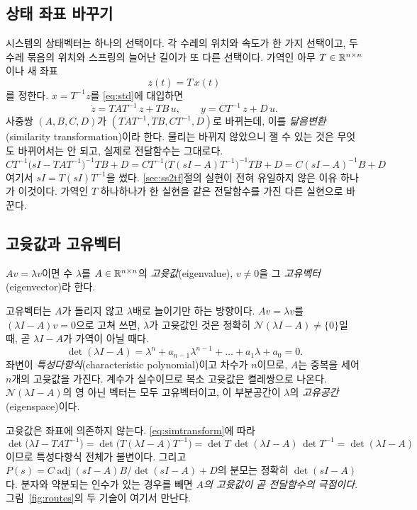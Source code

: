 \documentclass[11pt]{article}
\begin{document}
\subsection{상태 좌표 바꾸기}\label{sec:similarity}
시스템의 상태벡터는 하나의 선택이다. 각 수레의 위치와 속도가 한 가지 선택이고, 두
수레 묶음의 위치와 스프링의 늘어난 길이가 또 다른 선택이다. 가역인 아무
$T\in\mathbb{R}^{n\times n}$이나 새 좌표
\[
   z(t) = T\,x(t)
\]
를 정한다. $x=T^{-1}z$를 \eqref{eq:std}에 대입하면
\begin{equation}\label{eq:simtransform}
   \dot z = TAT^{-1}\,z + TB\,u, \qquad y = CT^{-1}\,z + D\,u .
\end{equation}
사중쌍 $(A,B,C,D)$가 $(TAT^{-1},TB,CT^{-1},D)$로 바뀌는데, 이를
\emph{닮음변환}(similarity transformation)이라 한다. 물리는 바뀌지 않았으니 잴 수
있는 것은 무엇도 바뀌어서는 안 되고, 실제로 전달함수는 그대로다.
\[
   CT^{-1}\bigl(sI-TAT^{-1}\bigr)^{-1}TB + D
   = CT^{-1}\bigl(T(sI-A)T^{-1}\bigr)^{-1}TB + D
   = C(sI-A)^{-1}B + D
\]
여기서 $sI=T(sI)T^{-1}$을 썼다. \ref{sec:ss2tf}절의 실현이 전혀 유일하지 않은
이유 하나가 이것이다. 가역인 $T$ 하나하나가 한 실현을 같은 전달함수를 가진 다른
실현으로 바꾼다.

\subsection{고윳값과 고유벡터}
\begin{definition}
$Av=\lambda v$이면 수 $\lambda$를 $A\in\mathbb{R}^{n\times n}$의 \emph{고윳값}(eigenvalue),
$v\neq0$을 그 \emph{고유벡터}(eigenvector)라 한다.
\end{definition}
고유벡터는 $A$가 돌리지 않고 $\lambda$배로 늘이기만 하는 방향이다. $Av=\lambda v$를
$(\lambda I-A)v=0$으로 고쳐 쓰면, $\lambda$가 고윳값인 것은 정확히
$\mathcal N(\lambda I-A)\neq\{0\}$일 때, 곧 $\lambda I-A$가 가역이 아닐 때다.
\begin{equation}\label{eq:charpoly}
   \det(\lambda I-A) = \lambda^{n}+a_{n-1}\lambda^{n-1}+\dots+a_1\lambda+a_0 = 0 .
\end{equation}
좌변이 \emph{특성다항식}(characteristic polynomial)이고 차수가 $n$이므로, $A$는
중복을 세어 $n$개의 고윳값을 가진다. 계수가 실수이므로 복소 고윳값은 켤레쌍으로
나온다. $\mathcal N(\lambda I-A)$의 영 아닌 벡터는 모두 고유벡터이고, 이 부분공간이
$\lambda$의 \emph{고유공간}(eigenspace)이다.

고윳값은 좌표에 의존하지 않는다. \eqref{eq:simtransform}에 따라
\[
   \det\bigl(\lambda I-TAT^{-1}\bigr) = \det\bigl(T(\lambda I-A)T^{-1}\bigr)
   = \det T\,\det(\lambda I-A)\,\det T^{-1} = \det(\lambda I-A)
\]
이므로 특성다항식 전체가 불변이다. 그리고
$P(s)=C\operatorname{adj}(sI-A)B/\det(sI-A)+D$의 분모는 정확히 $\det(sI-A)$다.
분자와 약분되는 인수가 있는 경우를 빼면 \emph{$A$의 고윳값이 곧 전달함수의
극점이다}. 그림~\ref{fig:routes}의 두 기술이 여기서 만난다.
\end{document}
